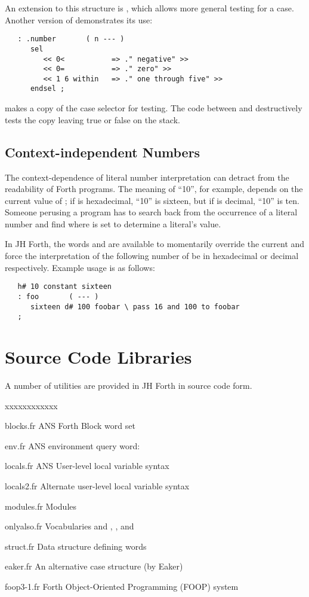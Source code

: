 An extension to this structure is \fw{=$>$}, which allows more general
testing for a case.  Another version of  demonstrates its
use:
\begin{verbatim}
   : .number       ( n --- )
      sel
         << 0<           => ." negative" >>
         << 0=           => ." zero" >>
         << 1 6 within   => ." one through five" >>
      endsel ;
\end{verbatim}
\fw{$<<$} makes a copy of the case selector for testing.  The code
between \fw{$<<$} and \fw{=$>$} destructively tests the copy leaving true
or false on the stack.

\subsection{Context-independent Numbers}
The context-dependence of literal number interpretation can
detract from the readability of Forth programs.  The meaning
of ``10'', for example, depends on the current value of ;
if  is hexadecimal, ``10'' is sixteen, but if 
is decimal, ``10'' is ten.  Someone perusing a program has to
search back from the occurrence of a literal number and find
where  is set to determine a literal's value.

In JH Forth, the words  and  are available
to momentarily override the current  and force the interpretation
of the following number of be in hexadecimal or decimal respectively.
Example usage is as follows:
\begin{verbatim}
   h# 10 constant sixteen
   : foo       ( --- )
      sixteen d# 100 foobar	\ pass 16 and 100 to foobar
   ;
\end{verbatim}

\section{Source Code Libraries}
A number of utilities are provided in JH Forth in source code
form.
\begin{namelist}{xxxxxxxxxxxx}
	\item[blocks.fr] ANS Forth Block word set
	\item[env.fr] ANS environment query word: 
        \item[locals.fr] ANS User-level local variable syntax
	\item[locals2.fr] Alternate user-level local variable syntax
	\item[modules.fr] Modules
        \item[onlyalso.fr] Vocabularies and ,
                , and 
        \item[struct.fr] Data structure defining words
        \item[eaker.fr] An alternative case structure (by Eaker)
        \item[foop3-1.fr] Forth Object-Oriented Programming (FOOP) system
\end{namelist}

